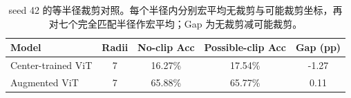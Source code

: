 \begin{table}[H]
  \centering
  \small
  \caption{seed 42 的等半径裁剪对照。每个半径内分别宏平均无裁剪与可能裁剪坐标，再对七个完全匹配半径作宏平均；Gap 为无裁剪减可能裁剪。}
  \label{tab:matched-clipping}
  \renewcommand{\arraystretch}{1.12}
  \begin{tabular}{lcccc}
    \toprule
    Model & Radii & No-clip Acc & Possible-clip Acc & Gap (pp) \\
    \midrule
    Center-trained ViT & 7 & 16.27\% & 17.54\% & -1.27 \\
    Augmented ViT & 7 & 65.88\% & 65.77\% & 0.11 \\
    \bottomrule
  \end{tabular}
\end{table}
